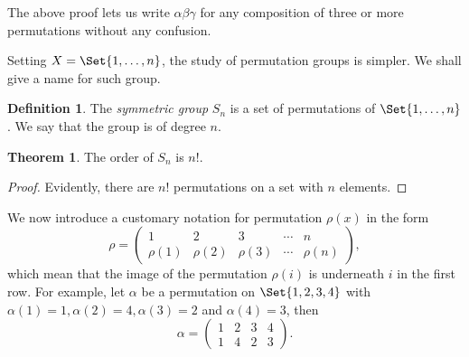 \documentclass[12pt]{book}
\theoremstyle{definition}
\newtheorem{definition}{Definition}[section]
\newtheorem{theorem}{Theorem}[chapter]
\theoremstyle{remark}
\begin{document}
				The above proof lets us write $\alpha\beta\gamma$ for any composition of three or more permutations without any confusion.
				
				Setting $X = \Set{1, \ldots, n}$, the study of permutation groups is simpler. We shall give a name for such group.
				\begin{definition}
					The \textit{symmetric group}  $S_n$ is a set of permutations of $\Set{1, \ldots, n}$. We say that the group is of degree $n$.
				\end{definition}

				\begin{theorem}
					The order of $S_n$ is $n!$.
				\end{theorem}
				\begin{proof}
					Evidently, there are $n!$ permutations on a set with $n$ elements.
				\end{proof}
				We now introduce a customary notation for permutation $\rho(x)$ in the form
				\begin{equation*}
					\rho =
					\begin{pmatrix}
						1 & 2 & 3 & \cdots & n \\
						\rho(1) & \rho(2) & \rho(3) & \cdots & \rho(n)
					\end{pmatrix},
				\end{equation*}
				which mean that the image of the permutation $\rho(i)$ is underneath $i$ in the first row. For example, let $\alpha$ be a permutation on $\Set{1, 2, 3, 4}$ with $\alpha(1) = 1, \alpha(2) = 4, \alpha(3) = 2$ and $\alpha(4) = 3$, then
				\begin{equation*}
				\alpha =
				\begin{pmatrix}
					1 & 2 & 3 & 4\\
					1 & 4 & 2 & 3
				\end{pmatrix}.
				\end{equation*}
\end{document}
